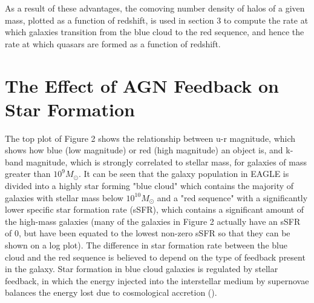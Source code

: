 \documentclass[12pt, twocolumn]{report}%
\begin{document}
As a result of these advantages, the comoving number density of halos of a given mass, plotted as a function of redshift, is used in section 3 to compute the rate at which galaxies transition from the blue cloud to the red sequence, and hence the rate at which quasars are formed as a function of redshift.

\section{The Effect of AGN Feedback on Star Formation}

The top plot of Figure 2 shows the relationship between u-r magnitude, which shows how blue (low magnitude) or red (high magnitude) an object is, and k-band magnitude, which is strongly correlated to stellar mass, for galaxies of mass greater than $10^9M_\odot$. It can be seen that the galaxy population in EAGLE is divided into a highly star forming "blue cloud" which contains the majority of galaxies with stellar mass below $10^{10}M_\odot$ and a "red sequence" with a significantly lower specific star formation rate (sSFR), which contains a significant amount of the high-mass galaxies (many of the galaxies in Figure 2 actually have an sSFR of 0, but have been equated to the lowest non-zero sSFR so that they can be shown on a log plot). The difference in star formation rate between the blue cloud and the red sequence is believed to depend on the type of feedback present in the galaxy. Star formation in blue cloud galaxies is regulated by  stellar feedback, in which the energy injected into the interstellar medium by supernovae balances the energy lost due to cosmological accretion (\cite{Ikea}).

\onecolumngrid
\end{document}
